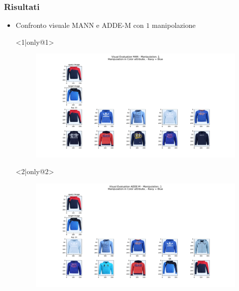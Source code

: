 \documentclass{beamer}
\begin{document}
\begin{frame}
\frametitle{Risultati}
\begin{itemize} 
\item Confronto visuale MANN e ADDE-M con $1$ manipolazione
\item[] <1|only@1> 
\hspace{-20px}
\begin{figure}[!h]
 			\begin{center}
 			\hspace{-70px}
 			\includegraphics[scale=0.29]{"Immagini/1_MANN.png"}
 			\end{center}
\end{figure}
\item[] <2|only@2>
\hspace{-20px} 
\begin{figure}[!h]
 			\begin{center}
 			\hspace{-70px}
 			\includegraphics[scale=0.29]{"Immagini/1_ADDEM.png"}
 			\end{center}
\end{figure}
\end{itemize}
\end{frame}
\end{document}
